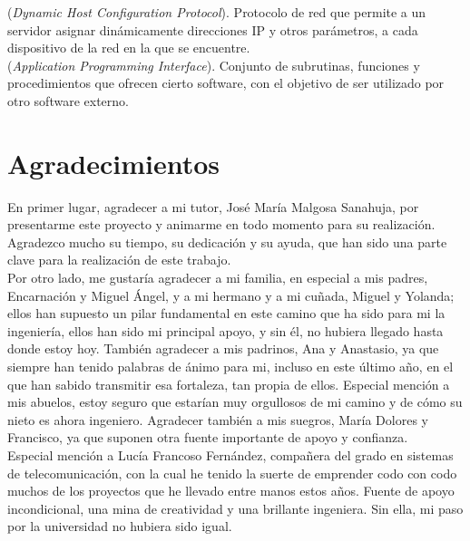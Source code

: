 \documentclass[a4paper, oneside, 12pt]{book}
\begin{document}
	 (\textit{Dynamic Host Configuration Protocol}). Protocolo de red que permite a un servidor asignar dinámicamente direcciones IP y otros parámetros, a cada dispositivo de la red en la que se encuentre. \\
	
	 (\textit{Application Programming Interface}). Conjunto de subrutinas, funciones y procedimientos que ofrecen cierto software, con el objetivo de ser utilizado por otro software externo.
		 
	
	\pagebreak
	
	\section*{Agradecimientos}
	\thispagestyle{plain}
	
	\noindent En primer lugar, agradecer a mi tutor, José María Malgosa Sanahuja, por presentarme este proyecto y animarme en todo momento para su realización. Agradezco mucho su tiempo, su dedicación y su ayuda, que han sido una parte clave para la realización de este trabajo. \\
	
	\noindent Por otro lado, me gustaría agradecer a mi familia, en especial a mis padres, Encarnación y Miguel Ángel, y a mi hermano y a mi cuñada, Miguel y Yolanda; ellos han supuesto un pilar fundamental en este camino que ha sido para mi la ingeniería, ellos han sido mi principal apoyo, y sin él, no hubiera llegado hasta donde estoy hoy. También agradecer a mis padrinos, Ana y Anastasio, ya que siempre han tenido palabras de ánimo para mi, incluso en este último año, en el que han sabido transmitir esa fortaleza, tan propia de ellos. Especial mención a mis abuelos, estoy seguro que estarían muy orgullosos de mi camino y de cómo su nieto es ahora ingeniero. Agradecer también a mis suegros, María Dolores y Francisco, ya que suponen otra fuente importante de apoyo y confianza. \\
	
	\noindent Especial mención a Lucía Francoso Fernández, compañera del grado en sistemas de telecomunicación, con la cual he tenido la suerte de emprender codo con codo muchos de los proyectos que he llevado entre manos estos años. Fuente de apoyo incondicional, una mina de creatividad y una brillante ingeniera. Sin ella, mi paso por la universidad no hubiera sido igual. \\
	
\end{document}
